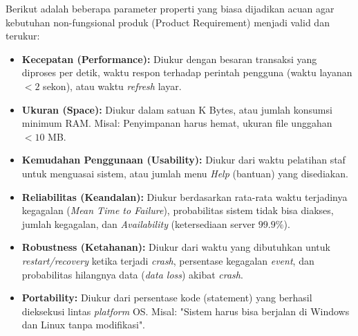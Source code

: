 \documentclass[12pt,a4paper]{article}
\begin{document}
Berikut adalah beberapa parameter properti yang biasa dijadikan acuan agar kebutuhan non-fungsional produk (Product Requirement) menjadi valid dan terukur:
\begin{itemize}
    \item \textbf{Kecepatan (Performance):} Diukur dengan besaran transaksi yang diproses per detik, waktu respon terhadap perintah pengguna (waktu layanan $< 2$ sekon), atau waktu \textit{refresh} layar.
    \item \textbf{Ukuran (Space):} Diukur dalam satuan K Bytes, atau jumlah konsumsi minimum RAM. Misal: Penyimpanan harus hemat, ukuran file unggahan $< 10$ MB.
    \item \textbf{Kemudahan Penggunaan (Usability):} Diukur dari waktu pelatihan staf untuk menguasai sistem, atau jumlah menu \textit{Help} (bantuan) yang disediakan.
    \item \textbf{Reliabilitas (Keandalan):} Diukur berdasarkan rata-rata waktu terjadinya kegagalan (\textit{Mean Time to Failure}), probabilitas sistem tidak bisa diakses, jumlah kegagalan, dan \textit{Availability} (ketersediaan server $99.9\%$).
    \item \textbf{Robustness (Ketahanan):} Diukur dari waktu yang dibutuhkan untuk \textit{restart/recovery} ketika terjadi \textit{crash}, persentase kegagalan \textit{event}, dan probabilitas hilangnya data (\textit{data loss}) akibat \textit{crash}.
    \item \textbf{Portability:} Diukur dari persentase kode (statement) yang berhasil dieksekusi lintas \textit{platform} OS. Misal: "Sistem harus bisa berjalan di Windows dan Linux tanpa modifikasi".
\end{itemize}
\end{document}
